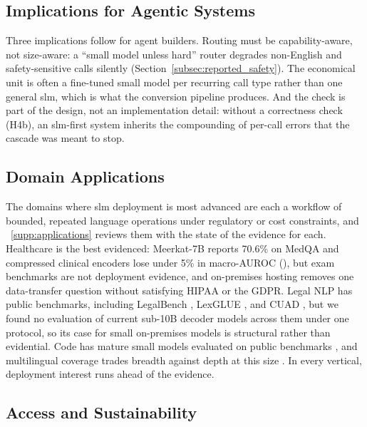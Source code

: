 \subsection{Implications for Agentic Systems}
\label{subsec:discussion_agentic}

Three implications follow for agent builders. Routing must be capability-aware, not size-aware: a ``small model unless hard'' router degrades non-English and safety-sensitive calls silently (Section~\ref{subsec:reported_safety}). The economical unit is often a fine-tuned small model per recurring call type rather than one general \gls{slm}, which is what the conversion pipeline produces. And the check is part of the design, not an implementation detail: without a correctness check (H4b), an \gls{slm}-first system inherits the compounding of per-call errors that the cascade was meant to stop.

\subsection{Domain Applications}
\label{sec:applications}
\label{subsec:discussion_applications}

The domains where \gls{slm} deployment is most advanced are each a workflow of bounded, repeated language operations under regulatory or cost constraints, and \suppsec~\ref{supp:applications} reviews them with the state of the evidence for each. Healthcare is the best evidenced: Meerkat-7B reports 70.6\% on MedQA \citep{kim2025meerkat} and compressed clinical encoders lose under 5\% in macro-AUROC \citep{hasan2024optimclm} (\evC), but exam benchmarks are not deployment evidence, and on-premises hosting removes one data-transfer question without satisfying HIPAA or the GDPR. Legal NLP has public benchmarks, including LegalBench \citep{guha2023legalbench}, LexGLUE \citep{chalkidis2022lexglue}, and CUAD \citep{hendrycks2021cuad}, but we found no evaluation of current sub-10B decoder models across them under one protocol, so its case for small on-premises models is structural rather than evidential. Code has mature small models evaluated on public benchmarks \citep{roziere2023codellama,lozhkov2024starcoder2,zhu2024deepseek_coder}, and multilingual coverage trades breadth against depth at this size \citep{aryabumi2024aya23}. In every vertical, deployment interest runs ahead of the evidence.

\subsection{Access and Sustainability}
\label{subsec:discussion_implications}

